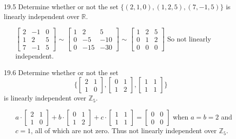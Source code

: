 \documentclass[12pt]{article}
\begin{document}
\begin{enumerate}
\item[19.5] Determine whether or not the set $\{(2, 1,0), (1,2,5), (7,-1,5)\}$ is linearly independent over $\mathbb{R}$.
\begin{enumerate}
\item[] $\left[ \begin{array}{ccc} 2 & -1 & 0 \\ 1 & 2 & 5 \\ 7 & -1 & 5 \end{array} \right]$
$\sim$ $\left[ \begin{array}{ccc} 1 & 2 & 5 \\ 0 & -5 & -10 \\ 0 & -15 & -30 \end{array} \right]$
$\sim$ $\left[ \begin{array}{ccc} 1 & 2 & 5 \\ 0 & 1 & 2 \\ 0 & 0 & 0 \end{array} \right]$
So not linearly independent.
\end{enumerate}

\item[19.6] Determine whether or not the set \[
\{ \left[ \begin{array}{cc} 2 & 1 \\ 1 & 0 \end{array} \right], 
\left[ \begin{array}{cc} 0 & 1 \\ 1 & 2 \end{array} \right], \left[ \begin{array}{cc} 1 & 1 \\ 1 & 1 \end{array} \right] \}
\]
is linearly independent over $\mathbb{Z}_5$.
\begin{enumerate}
\item[] $a \cdot \left[ \begin{array}{cc} 2 & 1 \\ 1 & 0 \end{array} \right] + 
b \cdot \left[ \begin{array}{cc} 0 & 1 \\ 1 & 2 \end{array} \right] + c \cdot \left[ \begin{array}{cc} 1 & 1 \\ 1 & 1 \end{array} \right] = \left[ \begin{array}{cc} 0 & 0 \\ 0 & 0 \end{array} \right]$ when $a = b = 2$ and $c = 1$, all of which are not zero. Thus not linearly independent over $\mathbb{Z}_5$.
\end{enumerate}


\end{enumerate}
\end{document}
